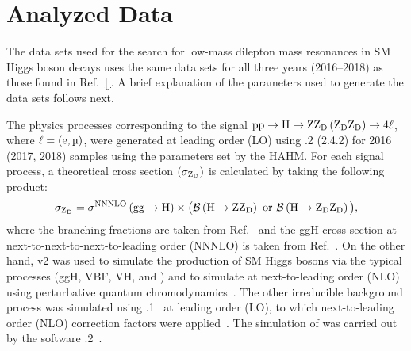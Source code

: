 \section{Analyzed Data}
\label{sec:analyzed_data_dilep}
The data sets used for the search for low-mass dilepton mass resonances in SM Higgs boson decays uses the same data sets for all three years (2016--2018) as those found in Ref.~\ref{}.
A brief explanation of the parameters used to generate the data sets follows next.

The physics processes corresponding to the signal $\mathrm{p} \mathrm{p} \to \mathrm{H} \to \text{Z} \mathrm{Z}_\text{D} \left( \mathrm{Z}_\text{D} \mathrm{Z}_\text{D} \right) \to 4\ell$, where $\ell = (\Pe, \Pmu)$, were generated at leading order (LO) using .2 (2.4.2) for 2016 (2017, 2018) samples using the parameters set by the HAHM.
For each signal process, a theoretical cross section $\left( \sigma_{\mathrm{Z}_\text{D}} \right)$ is calculated by taking the following product:
\begin{equation*}
    \sigma_{\mathrm{Z}_\text{D}} = \sigma^\text{NNNLO}\left( \mathrm{g}\mathrm{g} \to \mathrm{H} \right) \times \big( \mathcal{B} \left( \mathrm{H} \to \text{Z} \mathrm{Z}_\text{D} \right) \text{ or } \mathcal{B} \left( \mathrm{H} \to \mathrm{Z}_\text{D} \mathrm{Z}_\text{D} \right) \big),
\end{equation*}
where the branching fractions are taken from Ref.~\cite{Curtin:2014cca} and the ggH cross section at next-to-next-to-next-to-leading order (NNNLO) is taken from Ref.~\cite{Anastasiou:2016cez}.
On the other hand, \POWHEG v2 was used to simulate the production of SM Higgs bosons via the typical processes (ggH, VBF, VH, and \ttbarh) and to simulate \qqzz at next-to-leading order (NLO) using perturbative quantum chromodynamics~\cite{frixione_matching_2007, bagnaschi_higgs_2012, alioli_general_2010, nason_new_2004}.
The other irreducible background process \ggzz was simulated using .1~\cite{mcfm_campbell_precision_2019} at leading order (LO), to which next-to-leading order (NLO) correction factors were applied~\cite{nlo_corr_grazzini_fully_2018}.
The simulation of \htofourl was carried out by the software .2~\cite{hdecay_gao_spin_2010, hdecay_bolognesi_spin_2012}.


